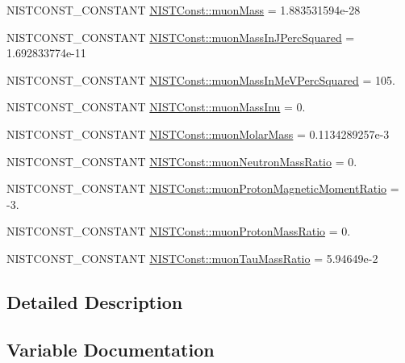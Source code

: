 \begin{DoxyCompactItemize}
\item 
N\+I\+S\+T\+C\+O\+N\+S\+T\+\_\+\+C\+O\+N\+S\+T\+A\+NT \mbox{\hyperlink{group___n_i_s_t_const-_muon_ga080664dd3b1c18f9956edb71386b5177}{N\+I\+S\+T\+Const\+::muon\+Mass}} = 1.\+883531594e-\/28
\item 
N\+I\+S\+T\+C\+O\+N\+S\+T\+\_\+\+C\+O\+N\+S\+T\+A\+NT \mbox{\hyperlink{group___n_i_s_t_const-_muon_gad4d3ef88615f2e5317fd48617c0740ce}{N\+I\+S\+T\+Const\+::muon\+Mass\+In\+J\+Perc\+Squared}} = 1.\+692833774e-\/11
\item 
N\+I\+S\+T\+C\+O\+N\+S\+T\+\_\+\+C\+O\+N\+S\+T\+A\+NT \mbox{\hyperlink{group___n_i_s_t_const-_muon_ga1931118dd705cad81b5defc9ecd5563b}{N\+I\+S\+T\+Const\+::muon\+Mass\+In\+Me\+V\+Perc\+Squared}} = 105.
\item 
N\+I\+S\+T\+C\+O\+N\+S\+T\+\_\+\+C\+O\+N\+S\+T\+A\+NT \mbox{\hyperlink{group___n_i_s_t_const-_muon_gabfb491f48425292980506d140a2a98e7}{N\+I\+S\+T\+Const\+::muon\+Mass\+Inu}} = 0.
\item 
N\+I\+S\+T\+C\+O\+N\+S\+T\+\_\+\+C\+O\+N\+S\+T\+A\+NT \mbox{\hyperlink{group___n_i_s_t_const-_muon_ga5954f4ab45a821dc96199dea5629b265}{N\+I\+S\+T\+Const\+::muon\+Molar\+Mass}} = 0.\+1134289257e-\/3
\item 
N\+I\+S\+T\+C\+O\+N\+S\+T\+\_\+\+C\+O\+N\+S\+T\+A\+NT \mbox{\hyperlink{group___n_i_s_t_const-_muon_ga8618e14187f44f64729c26685f42387d}{N\+I\+S\+T\+Const\+::muon\+Neutron\+Mass\+Ratio}} = 0.
\item 
N\+I\+S\+T\+C\+O\+N\+S\+T\+\_\+\+C\+O\+N\+S\+T\+A\+NT \mbox{\hyperlink{group___n_i_s_t_const-_muon_ga535321fb921425b92d4f09870b6b500b}{N\+I\+S\+T\+Const\+::muon\+Proton\+Magnetic\+Moment\+Ratio}} = -\/3.
\item 
N\+I\+S\+T\+C\+O\+N\+S\+T\+\_\+\+C\+O\+N\+S\+T\+A\+NT \mbox{\hyperlink{group___n_i_s_t_const-_muon_gaaaab6090c4f02dd57bacde06a8113ae8}{N\+I\+S\+T\+Const\+::muon\+Proton\+Mass\+Ratio}} = 0.
\item 
N\+I\+S\+T\+C\+O\+N\+S\+T\+\_\+\+C\+O\+N\+S\+T\+A\+NT \mbox{\hyperlink{group___n_i_s_t_const-_muon_ga2429d4c7a129833cea3e1f94959c541c}{N\+I\+S\+T\+Const\+::muon\+Tau\+Mass\+Ratio}} = 5.\+94649e-\/2
\end{DoxyCompactItemize}


\subsection{Detailed Description}


\subsection{Variable Documentation}
\mbox{\label{group___n_i_s_t_const-_muon_gafa8e9fc422ec4dab36ec7fed34c4b1b0}} 
